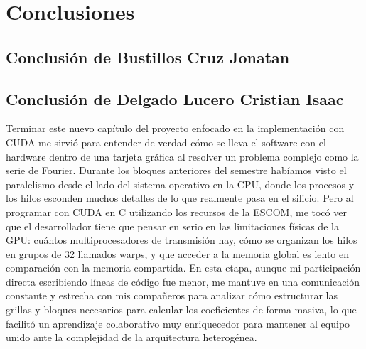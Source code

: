 
\chapter{Conclusiones}


\newpage
\section{Conclusión de Bustillos Cruz Jonatan}

\newpage
\section{Conclusión de Delgado Lucero Cristian Isaac}

Terminar este nuevo capítulo del proyecto enfocado en la implementación con CUDA me sirvió para entender de verdad cómo se lleva el software con el hardware dentro de una tarjeta gráfica al resolver un problema complejo como la serie de Fourier. Durante los bloques anteriores del semestre habíamos visto el paralelismo desde el lado del sistema operativo en la CPU, donde los procesos y los hilos esconden muchos detalles de lo que realmente pasa en el silicio. Pero al programar con CUDA en C utilizando los recursos de la ESCOM, me tocó ver que el desarrollador tiene que pensar en serio en las limitaciones físicas de la GPU: cuántos multiprocesadores de transmisión hay, cómo se organizan los hilos en grupos de 32 llamados warps, y que acceder a la memoria global es lento en comparación con la memoria compartida. En esta etapa, aunque mi participación directa escribiendo líneas de código fue menor, me mantuve en una comunicación constante y estrecha con mis compañeros para analizar cómo estructurar las grillas y bloques necesarios para calcular los coeficientes de forma masiva, lo que facilitó un aprendizaje colaborativo muy enriquecedor para mantener al equipo unido ante la complejidad de la arquitectura heterogénea.

